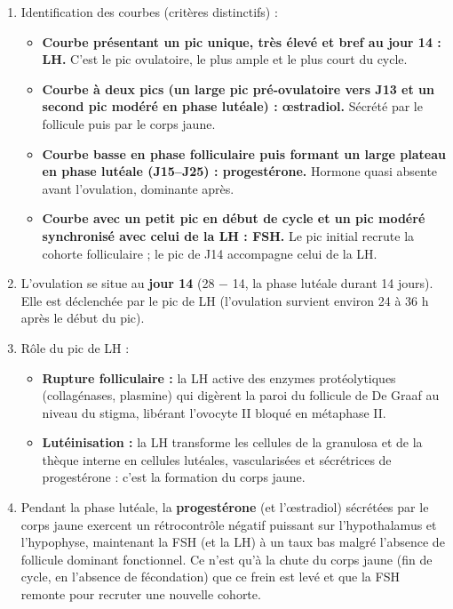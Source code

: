 \documentclass[11pt]{article}
\newcommand{\cle}[1]{{\popxbold\color{popdark}#1}}
\begin{document}
\begin{corrige}
\begin{enumerate}
    \item Identification des courbes (critères distinctifs) :
    \begin{itemize}
        \item \textbf{Courbe présentant un pic unique, très élevé et bref au jour 14 : LH.} C'est le pic ovulatoire, le plus ample et le plus court du cycle.
        \item \textbf{Courbe à deux pics (un large pic pré-ovulatoire vers J13 et un second pic modéré en phase lutéale) : œstradiol.} Sécrété par le follicule puis par le corps jaune.
        \item \textbf{Courbe basse en phase folliculaire puis formant un large plateau en phase lutéale (J15--J25) : progestérone.} Hormone quasi absente avant l'ovulation, dominante après.
        \item \textbf{Courbe avec un petit pic en début de cycle et un pic modéré synchronisé avec celui de la LH : FSH.} Le pic initial recrute la cohorte folliculaire ; le pic de J14 accompagne celui de la LH.
    \end{itemize}
    \item L'ovulation se situe au \textbf{jour 14} (28 $-$ 14, la phase lutéale durant 14 jours). Elle est déclenchée par le \cle{pic de LH} (l'ovulation survient environ 24 à 36 h après le début du pic).
    \item Rôle du pic de LH :
    \begin{itemize}
        \item[(a)] \textbf{Rupture folliculaire :} la LH active des enzymes protéolytiques (collagénases, plasmine) qui digèrent la paroi du follicule de De Graaf au niveau du stigma, libérant l'ovocyte II bloqué en métaphase II.
        \item[(b)] \textbf{Lutéinisation :} la LH transforme les cellules de la granulosa et de la thèque interne en cellules lutéales, vascularisées et sécrétrices de progestérone : c'est la formation du corps jaune.
    \end{itemize}
    \item Pendant la phase lutéale, la \textbf{progestérone} (et l'œstradiol) sécrétées par le corps jaune exercent un \cle{rétrocontrôle négatif} puissant sur l'hypothalamus et l'hypophyse, maintenant la FSH (et la LH) à un taux bas malgré l'absence de follicule dominant fonctionnel. Ce n'est qu'à la chute du corps jaune (fin de cycle, en l'absence de fécondation) que ce frein est levé et que la FSH remonte pour recruter une nouvelle cohorte.
\end{enumerate}
\end{corrige}
\end{document}
